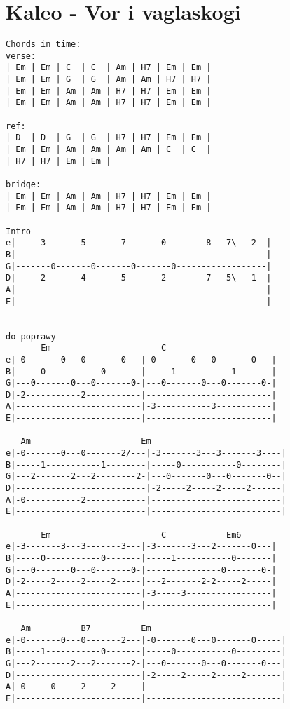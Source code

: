 \section{Kaleo - Vor i vaglaskogi}
\begin{verbatim}
Chords in time:
verse:
| Em | Em | C  | C  | Am | H7 | Em | Em |
| Em | Em | G  | G  | Am | Am | H7 | H7 |
| Em | Em | Am | Am | H7 | H7 | Em | Em |
| Em | Em | Am | Am | H7 | H7 | Em | Em |

ref:
| D  | D  | G  | G  | H7 | H7 | Em | Em |
| Em | Em | Am | Am | Am | Am | C  | C  | 
| H7 | H7 | Em | Em |

bridge:
| Em | Em | Am | Am | H7 | H7 | Em | Em |
| Em | Em | Am | Am | H7 | H7 | Em | Em |

Intro
e|-----3-------5-------7-------0--------8---7\---2--|
B|--------------------------------------------------|
G|-------0-------0-------0-------0------------------|
D|-----2-------4-------5-------2--------7---5\---1--|
A|--------------------------------------------------|
E|--------------------------------------------------|


do poprawy
       Em                      C                     
e|-0-------0---0-------0---|-0-------0---0-------0---|
B|-----0-----------0-------|-----1-----------1-------|
G|---0-------0---0-------0-|---0-------0---0-------0-|
D|-2-----------2-----------|-------------------------|
A|-------------------------|-3-----------3-----------|
E|-------------------------|-------------------------|

   Am                      Em
e|-0-------0---0-------2/---|-3-------3---3-------3----|
B|-----1-----------1--------|-----0-----------0--------|
G|---2-------2---2--------2-|---0-------0---0-------0--|
D|--------------------------|-2-----2-----2-----2------|
A|-0-----------2------------|--------------------------|
E|--------------------------|--------------------------|

       Em                      C            Em6      
e|-3-------3---3-------3---|-3-------3---2-------0---|
B|-----0-----------0-------|-----1-----------0-------|
G|---0-------0---0-------0-|---------------0-------0-|
D|-2-----2-----2-----2-----|---2-------2-2-----2-----|
A|-------------------------|-3-----3-----------------|
E|-------------------------|-------------------------|

   Am          B7          Em
e|-0-------0---0-------2---|-0-------0---0-------0-----|
B|-----1-----------0-------|-----0-----------0---------|
G|---2-------2---2-------2-|---0-------0---0-------0---|
D|-------------------------|-2-----2-----2-----2-------|
A|-0-----0-----2-----2-----|---------------------------|
E|-------------------------|---------------------------|
\end{verbatim}
